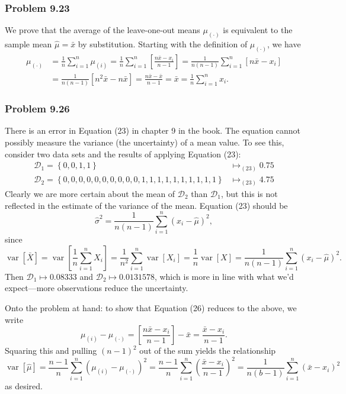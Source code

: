 \documentclass[12pt, a4paper]{article}
\newcommand{\D}{\mathcal{D}}
\DeclareMathOperator{\var}{\operatorname{var}}
\begin{document}
{\subsubsection*{Problem 9.23}
We prove that the average of the leave-one-out means $\mu_{(\cdot)}$ is equivalent to the sample mean $\hat{\mu} = \bar{x}$ by substitution.
Starting with the definition of $\mu_{(\cdot)}$, we have
\begin{align*}
	\mu_{(\cdot)} &= \frac{1}{n} \sum_{i=1}^{n} \mu_{(i)}
	= \frac{1}{n} \sum_{i=1}^{n} \left[  \frac{n \bar{x} - x_i}{n-1} \right]
	= \frac{1}{n(n-1)} \sum_{i=1}^{n} \left[  n \bar{x} - x_i \right] \\
	&= \frac{1}{n(n-1)} \left[ n^2 \bar{x} - n \bar{x} \right]
	=
	\frac{n\bar{x} - \bar{x}}{n-1} = \bar{x} = \frac{1}{n} \sum_{i=1}^{n} x_i.
\end{align*}

\subsubsection*{Problem 9.26}
There is an error in Equation (23) in chapter 9 in the book.
The equation cannot possibly measure the variance (the uncertainty) of a mean value.
To see this, consider two data sets and the results of applying Equation (23):
\begin{align*}
	\D_1 = \left\{0,0,1, 1\right\}  & \mapsto_{(23)} 0.75 \\ 
	\D_2 = \left\{0,0,0,0,0,0,0,0,0,0,1,1,1,1,1,1,1,1,1,1\right\}  & \mapsto_{(23)} 4.75
\end{align*}
Clearly we are more certain about the mean of $\D_2$ than $\D_1$, but this is not reflected in the estimate of the variance of the mean.
Equation (23) should be
\begin{equation*}
\hat{\sigma}^2 = \frac{1}{n (n-1)} \sum_{i=1}^{n} \left( x_i - \hat{\mu} \right)^2,
\end{equation*}
since
\begin{equation*}
	\var \left[ \bar{X} \right] = \var \left[ \frac{1}{n} \sum_{i=1}^{n}  X_i \right]
	= \frac{1}{n^2} \sum_{i=1}^{n} \var \left[    X_i \right]
	= \frac{1}{n} \var \left[    X \right]
	= \frac{1}{n (n-1)} \sum_{i=1}^{n} \left( x_i - \hat{\mu} \right)^2.
\end{equation*}
Then $\D_1  \mapsto 0.08333$ and $\D_2  \mapsto 0.0131578$, which is more in line with what we'd expect---more observations reduce the uncertainty.

Onto the problem at hand: to show that Equation (26) reduces to the above, we write
\begin{equation*}
	\mu_{(i)} - \mu_{(\cdot)} = \left[  \frac{n \bar{x} - x_i}{n-1} \right] - \bar{x} = \frac{\bar{x} - x_i}{n-1}.
\end{equation*}
Squaring this and pulling $(n-1)^2$ out of the sum yields the relationship
\begin{equation*}
	\var \left[ \hat{\mu} \right] = \frac{n-1}{n} 
	\sum_{i=1}^{n} \left( \mu_{(i)} - \mu_{(\cdot)} \right)^2
	= \frac{n-1}{n} 
	\sum_{i=1}^{n} \left( \frac{\bar{x} - x_i}{n-1} \right)^2
	= \frac{1}{n (b-1)} 
	\sum_{i=1}^{n} \left(\bar{x} - x_i \right)^2
\end{equation*}
as desired.


}
\end{document}
